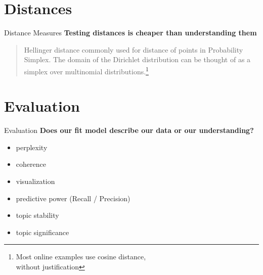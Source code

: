\documentclass[10pt]{beamer}
\begin{document}
\section{Distances}

\begin{frame}{Distance Measures}
  {\bf Testing distances is cheaper than understanding them}

  \begin{quote}
    Hellinger distance\cite{krstovski2013efficient} commonly used for distance of points in Probability Simplex. The domain of the Dirichlet distribution can be thought of as a simplex over multinomial distributions.\footnote{Most online examples use cosine distance, \\without justification}
  \end{quote}
\end{frame}

\section{Evaluation}

\begin{frame}{Evaluation}
  {\bf Does our fit model describe our data or our understanding?}

  \begin{itemize}
  \item perplexity
  \item coherence\cite{Roder2015,TACL582}
  \item visualization\cite{sievert-shirley-2014-ldavis,2012-termite}
  \item predictive power (Recall / Precision)
  \item topic stability\cite{Yang2016}
  \item topic significance\cite{alsumait2009topic}
  \end{itemize}
\end{frame}
\end{document}
